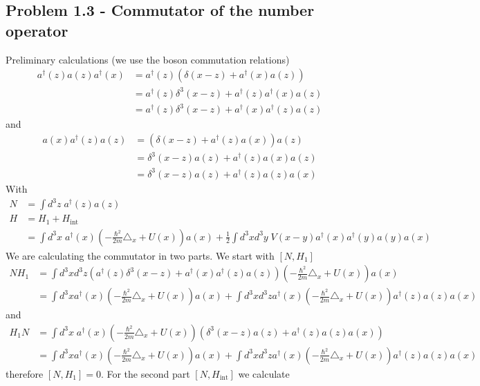 \documentclass[../main.tex]{subfiles}
\begin{document}
\subsection{Problem 1.3 - Commutator of the number operator}
Preliminary calculations (we use the boson commutation relations)
\begin{align}
a^\dagger(z)a(z)a^\dagger(x)&=a^\dagger(z)(\delta(x-z)+a^\dagger(x)a(z))\\
&=a^\dagger(z)\delta^3(x-z)+a^\dagger(z)a^\dagger(x)a(z)\\
&=a^\dagger(z)\delta^3(x-z)+a^\dagger(x)a^\dagger(z)a(z)
\end{align}
and
\begin{align}
a(x)a^\dagger(z)a(z)&=(\delta(x-z)+a^\dagger(z)a(x))a(z)\\
&=\delta^3(x-z)a(z)+a^\dagger(z)a(x)a(z)\\
&=\delta^3(x-z)a(z)+a^\dagger(z)a(z)a(x)
\end{align}
With
\begin{align}
N&=\int d^3z\; a^\dagger(z)a(z)\\
H&=H_1+H_\text{int}\\
&=\int d^3x\; a^\dagger(x)\left(-\frac{\hbar^2}{2m}\triangle_x+U(x)\right)a(x)+\frac{1}{2}\int d^3xd^3y\;V(x-y) a^\dagger(x)a^\dagger(y)a(y)a(x)
\end{align}
We are calculating the commutator in two parts. We start with $[N,H_1]$
\begin{align}
N H_1&=\int d^3xd^3z\left(a^\dagger(z)\delta^3(x-z)+a^\dagger(x)a^\dagger(z)a(z)\right)\left(-\frac{\hbar^2}{2m}\triangle_x+U(x)\right)a(x)\\
&=\int d^3xa^\dagger(x)\left(-\frac{\hbar^2}{2m}\triangle_x+U(x)\right)a(x)+\int d^3xd^3za^\dagger(x)\left(-\frac{\hbar^2}{2m}\triangle_x+U(x)\right)a^\dagger(z)a(z)a(x)
\end{align}
and
\begin{align}
H_1N&=\int d^3x\; a^\dagger(x)\left(-\frac{\hbar^2}{2m}\triangle_x+U(x)\right)(\delta^3(x-z)a(z)+a^\dagger(z)a(z)a(x))\\
&=\int d^3xa^\dagger(x)\left(-\frac{\hbar^2}{2m}\triangle_x+U(x)\right)a(x)+\int d^3xd^3za^\dagger(x)\left(-\frac{\hbar^2}{2m}\triangle_x+U(x)\right)a^\dagger(z)a(z)a(x)
\end{align}
therefore $[N,H_1]=0$.
For the second part $[N,H_\text{int}]$ we calculate
\end{document}
